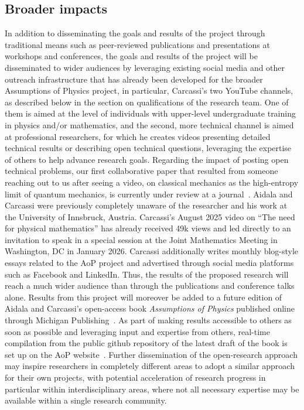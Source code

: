 \subsection{Broader impacts}
In addition to disseminating the goals and results of the project through traditional means such as peer-reviewed publications and presentations at workshops and conferences, the goals and results of the project will be disseminated to wider audiences by leveraging existing social media and other outreach infrastructure that has already been developed for the broader Assumptions of Physics project, in particular, Carcassi's two YouTube channels, as described below in the section on qualifications of the research team.  One of them is aimed at the level of individuals with upper-level undergraduate training in physics and/or mathematics, and the second, more technical channel is aimed at professional researchers, for which he creates videos presenting detailed technical results or describing open technical questions, leveraging the expertise of others to help advance research goals.  Regarding the impact of posting open technical problems, our first collaborative paper that resulted from someone reaching out to us after seeing a video, on classical mechanics as the high-entropy limit of quantum mechanics, is currently under review at a journal~\cite{aop-classicallimit}.  Aidala and Carcassi were previously completely unaware of the researcher and his work at the University of Innsbruck, Austria. Carcassi's August 2025 video on ``The need for physical mathematics'' has already received 49k views and led directly to an invitation to speak in a special session at the Joint Mathematics Meeting in Washington, DC in January 2026. Carcassi additionally writes monthly blog-style essays related to the AoP project and advertised through social media platforms such as Facebook and LinkedIn.  Thus, the results of the proposed research will reach a much wider audience than through the publications and conference talks alone.  Results from this project will moreover be added to a future edition of Aidala and Carcassi's open-access book \textit{Assumptions of Physics} published online through Michigan Publishing~\cite{aop-book}. As part of making results accessible to others as soon as possible and leveraging input and expertise from others, real-time compilation from the public github repository of the latest draft of the book is set up on the AoP website~\cite{aop-website}. Further dissemination of the open-research approach may inspire researchers in completely different areas to adopt a similar approach for their own projects, with potential acceleration of research progress in particular within interdisciplinary areas, where not all necessary expertise may be available within a single research community.  

